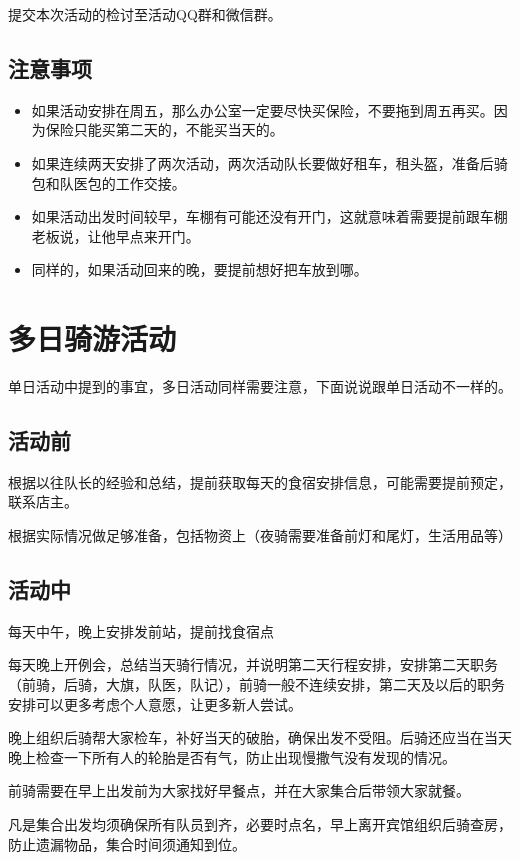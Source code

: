 \documentclass{ctexbook}
\begin{document}
提交本次活动的检讨至活动QQ群和微信群。
\subsection{注意事项}
    \begin{itemize}
        \item 如果活动安排在周五，那么办公室一定要尽快买保险，不要拖到周五再买。因为保险只能买第二天的，不能买当天的。
        \item 如果连续两天安排了两次活动，两次活动队长要做好租车，租头盔，准备后骑包和队医包的工作交接。
        \item 如果活动出发时间较早，车棚有可能还没有开门，这就意味着需要提前跟车棚老板说，让他早点来开门。
        \item 同样的，如果活动回来的晚，要提前想好把车放到哪。
    \end{itemize}


\section{多日骑游活动}

单日活动中提到的事宜，多日活动同样需要注意，下面说说跟单日活动不一样的。

\subsection{活动前}

根据以往队长的经验和总结，提前获取每天的食宿安排信息，可能需要提前预定，联系店主。

根据实际情况做足够准备，包括物资上（夜骑需要准备前灯和尾灯，生活用品等）

\subsection{活动中}

每天中午，晚上安排发前站，提前找食宿点

每天晚上开例会，总结当天骑行情况，并说明第二天行程安排，安排第二天职务（前骑，后骑，大旗，队医，队记），前骑一般不连续安排，第二天及以后的职务安排可以更多考虑个人意愿，让更多新人尝试。

晚上组织后骑帮大家检车，补好当天的破胎，确保出发不受阻。后骑还应当在当天晚上检查一下所有人的轮胎是否有气，防止出现慢撒气没有发现的情况。

前骑需要在早上出发前为大家找好早餐点，并在大家集合后带领大家就餐。

凡是集合出发均须确保所有队员到齐，必要时点名，早上离开宾馆组织后骑查房，防止遗漏物品，集合时间须通知到位。
\end{document}
